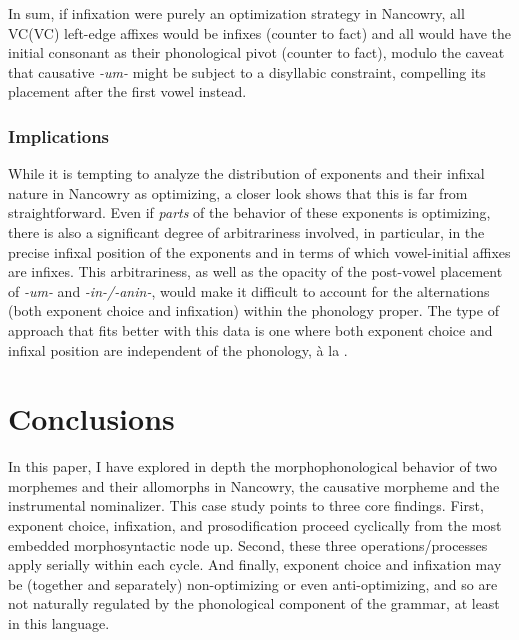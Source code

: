\documentclass[output=paper]{langscibook}
\begin{document}
In sum, if infixation were purely an optimization strategy in Nancowry, all VC(VC) left-edge affixes would be infixes (counter to fact) and all would have the initial consonant as their phonological pivot (counter to fact), modulo the caveat that causative \textit{-um-} might be subject to a disyllabic constraint, compelling its placement after the first vowel instead.


\subsubsection{Implications}\label{sec:kalin:4.3.3}

While it is tempting to analyze the distribution of exponents and their infixal nature in Nancowry as optimizing, a closer look shows that this is far from straightforward. Even if \textit{parts} of the behavior of these exponents is optimizing, there is also a significant degree of arbitrariness involved, in particular, in the precise infixal position of the exponents and in terms of which vowel-initial affixes are infixes. This arbitrariness, as well as the opacity of the post-vowel placement of \textit{-um-} and \textit{-in-/-anin-}, would make it difficult to account for the alternations (both exponent choice and infixation) within the phonology proper. The type of approach that fits better with this data is one where both exponent choice and infixal position are  independent of the phonology, \`a la \citet{Paster06,Yu07,Kalin20,KalinIP,KalinRolle21}.%

\section{Conclusions}\label{sec:kalin:5}

In this paper, I have explored in depth the morphophonological behavior of two morphemes and their allomorphs in Nancowry, the causative morpheme and the instrumental nominalizer. This case study points to three core findings. First, exponent choice, infixation, and prosodification proceed cyclically from the most embedded morphosyntactic node up. Second, these three operations/processes apply serially within each cycle. And finally, exponent choice and infixation may be (together and separately) non-optimizing or even anti-optimizing, and so are not naturally regulated by the phonological component of the grammar, at least in this language.
\end{document}
